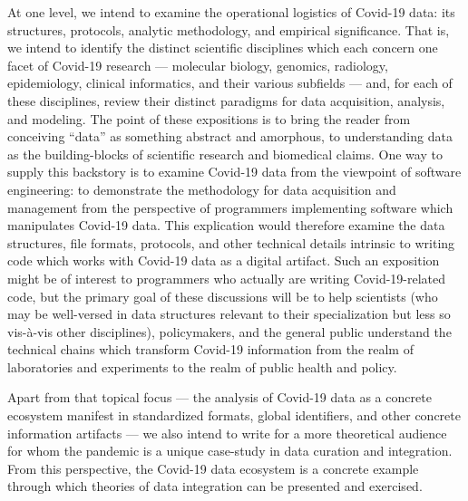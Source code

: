 \documentclass{statsoc}
\newcommand{\p}[1]{

\vspace{.75em}#1}
\newcommand{\textscc}[1]{{\color{orr!35!black}{{%
						\fontfamily{Cabin-TLF}\fontseries{b}\selectfont{\textsc{\scriptsize{#1}}}}}}}
\newcommand{\AcronymText}[1]{{\textscc{#1}}}
\newcommand{\q}[1]{{\fontfamily{qcr}\selectfont ``}#1{\fontfamily{qcr}\selectfont ''}}
\newcommand{\API}{\resizebox{!}{7pt}{\AcronymText{API}}}
\newcommand{\visavis}{vis-\`a-vis}
\begin{document}
{%
\p{At one level, we intend to examine the 
operational logistics of Covid-19 data: its 
structures, protocols, analytic methodology, 
and empirical significance.  That is, we 
intend to identify the distinct scientific 
disciplines which each concern one facet 
of Covid-19 research --- molecular biology, 
genomics, radiology, epidemiology, clinical 
informatics, and their various subfields 
--- and, for each of these disciplines, 
review their distinct paradigms for 
data acquisition, analysis, and modeling.  
The point of these expositions is to bring 
the reader from conceiving \q{data} as something 
abstract and amorphous, to understanding 
data as the building-blocks of scientific 
research and biomedical claims.  One way to supply this backstory 
is to examine Covid-19 data from the viewpoint 
of software engineering: to demonstrate 
the methodology for data acquisition and 
management from the perspective of programmers 
implementing software which manipulates Covid-19 data.  
This explication would therefore examine the 
data structures, file formats, \API{} protocols, 
and other technical details intrinsic to writing 
code which works with Covid-19 data as a 
digital artifact.  Such an exposition might be 
of interest to programmers who actually are 
writing Covid-19-related code, but the primary 
goal of these discussions will be to help 
scientists (who may be well-versed in data 
structures relevant to their specialization 
but less so \visavis{} other disciplines), 
policymakers, and the general public understand 
the technical chains which transform 
Covid-19 information from the realm of 
laboratories and experiments to the realm of 
public health and policy.}


\p{Apart from that topical focus --- the analysis 
of Covid-19 data as a concrete ecosystem 
manifest in standardized formats, global 
identifiers, and other concrete information 
artifacts --- we also intend to write for a 
more theoretical audience for whom the 
pandemic is a unique case-study in data 
curation and integration.  From this perspective, 
the Covid-19 data ecosystem is a concrete example 
through which theories of data integration can 
be presented and exercised.}

}
\end{document}
